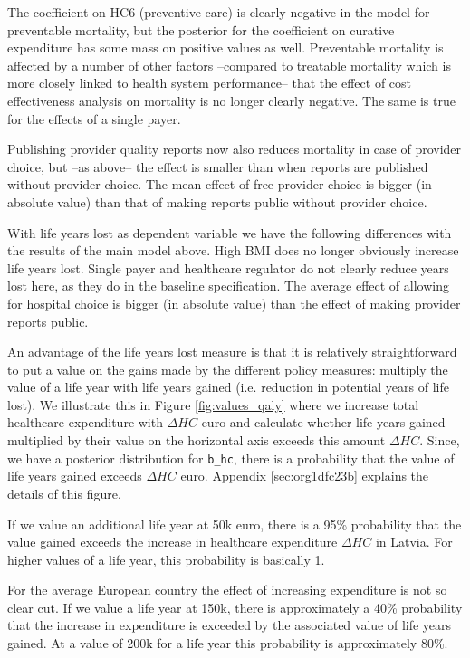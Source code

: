 \documentclass[a4paper,12pt]{article}
\begin{document}
The coefficient on HC6 (preventive care) is clearly negative in the model for preventable mortality, but the posterior for the coefficient on curative expenditure has some mass on positive values as well. Preventable mortality is affected by a number of other factors --compared to treatable mortality which is more closely linked to health system performance-- that the effect of cost effectiveness analysis on mortality is no longer clearly negative. The same is true for the effects of a single payer.

Publishing provider quality reports now also reduces mortality in case of provider choice, but --as above-- the effect is smaller than when reports are published without provider choice. The mean effect of free provider choice is bigger (in absolute value) than that of making reports public without provider choice.

With life years lost as dependent variable we have the following differences with the results of the main model above. High BMI does no longer obviously increase life years lost. Single payer and healthcare regulator do not clearly reduce years lost here, as they do in the baseline specification. The average effect of allowing for hospital choice is bigger (in absolute value) than the effect of making provider reports public.

An advantage of the life years lost measure is that it is relatively straightforward to put a value on the gains made by the different policy measures: multiply the value of a life year with life years gained (i.e. reduction in potential years of life lost). We illustrate this in Figure \ref{fig:values_qaly} where we increase total healthcare expenditure with \(\Delta HC\) euro and calculate whether life years gained multiplied by their value on the horizontal axis exceeds this amount \(\Delta HC\). Since, we have a posterior distribution for \texttt{b\_hc}, there is a probability that the value of life years gained exceeds \(\Delta HC\) euro. Appendix \ref{sec:org1dfc23b} explains the details of this figure.

If we value an additional life year at 50k euro, there is a 95\% probability that the value gained exceeds the increase in healthcare expenditure \(\Delta HC\) in Latvia. For higher values of a life year, this probability is basically 1.

For the average European country the effect of increasing expenditure is not so clear cut. If we value a life year at 150k, there is approximately a 40\% probability that the increase in expenditure is exceeded by the associated value of life years gained. At a value of 200k for a life year this probability is approximately 80\%.
\end{document}
